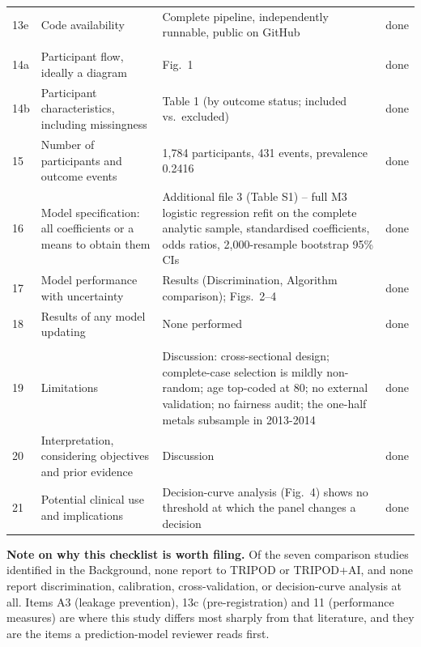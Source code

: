 \documentclass[10pt]{article}
\begin{document}
\begin{longtable}{C{0.7cm}L{4.3cm}L{9cm}C{1.2cm}}
13e & Code availability & Complete pipeline, independently runnable, public on GitHub & done \\
\addlinespace
{} \\
14a & Participant flow, ideally a diagram & Fig.~1 & done \\
14b & Participant characteristics, including missingness & Table 1 (by outcome status; included vs.\ excluded) & done \\
15 & Number of participants and outcome events & 1,784 participants, 431 events, prevalence 0.2416 & done \\
16 & Model specification: all coefficients or a means to obtain them & Additional file 3 (Table S1) -- full M3 logistic regression refit on the complete analytic sample, standardised coefficients, odds ratios, 2,000-resample bootstrap 95\% CIs & done \\
17 & Model performance with uncertainty & Results (Discrimination, Algorithm comparison); Figs.~2--4 & done \\
18 & Results of any model updating & None performed & done \\
\addlinespace
{} \\
19 & Limitations & Discussion: cross-sectional design; complete-case selection is mildly non-random; age top-coded at 80; no external validation; no fairness audit; the one-half metals subsample in 2013-2014 & done \\
20 & Interpretation, considering objectives and prior evidence & Discussion & done \\
21 & Potential clinical use and implications & Decision-curve analysis (Fig.~4) shows no threshold at which the panel changes a decision & done \\
\end{longtable}

\bigskip

\textbf{Note on why this checklist is worth filing.} Of the seven comparison studies identified in the Background, none report to TRIPOD or TRIPOD+AI, and none report discrimination, calibration, cross-validation, or decision-curve analysis at all. Items A3 (leakage prevention), 13c (pre-registration) and 11 (performance measures) are where this study differs most sharply from that literature, and they are the items a prediction-model reviewer reads first.
\end{document}

